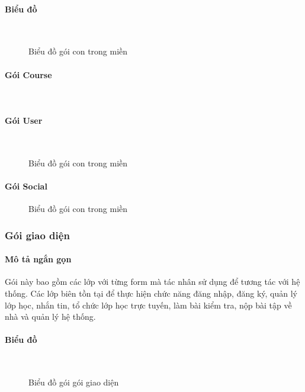 \documentclass[./../main_file.tex]{subfiles}
\begin{document}
	\paragraph{Biểu đồ} ~\\
	\begin{figure}[htb]
		\centering
		\resizebox{0.6\textwidth}{!}{}
		\caption{Biểu đồ gói con trong miền}
	\end{figure}

	\paragraph{Gói Course} ~\\
		
	\paragraph{Gói User} ~\\
	\begin{figure}[H]
		\centering
		\resizebox{1.0\textwidth}{!}{}
		\caption{Biểu đồ gói con trong miền}
	\end{figure}

	\paragraph{Gói Social}
	\begin{figure}[H]
		\centering
		\resizebox{1.0\textwidth}{!}{}
		\caption{Biểu đồ gói con trong miền}
	\end{figure}
	
	\subsubsection{Gói giao diện}
	\paragraph{Mô tả ngắn gọn}
	Gói này bao gồm các lớp với từng form mà tác nhân sử dụng để tương tác với hệ thống. Các lớp biên tồn tại để thực hiện chức năng đăng nhập, đăng ký, quản lý lớp học, nhắn tin, tổ chức lớp học trực tuyến, làm bài kiểm tra, nộp bài tập về nhà và quản lý hệ thống.
	\paragraph{Biểu đồ} ~\\
	\begin{figure}[H]
		\centering
		\resizebox{1.0\textwidth}{!}{}
		\caption{Biểu đồ gói gói giao diện}
	\end{figure}
\end{document}
